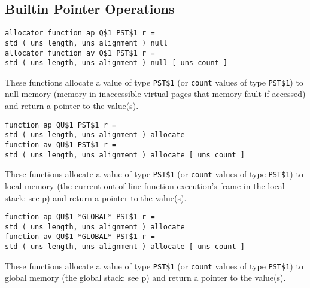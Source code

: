 \documentclass[12pt]{article}
\newcommand{\pagref}[1]{p\pageref{#1}}
\newenvironment{indpar}[1][0.3in]%
	{\begin{list}{}%
		     {\setlength{\itemsep}{0in}%
		      \setlength{\topsep}{0in}%
		      \setlength{\parsep}{1ex}%
		      \setlength{\labelwidth}{#1}%
		      \setlength{\leftmargin}{#1}%
		      \addtolength{\leftmargin}{\labelsep}}%
	 \item}%
	{\end{list}}
\begin{document}
\subsection{Builtin Pointer Operations}
\label{BUILTIN-POINTER-OPERATIONS}

{\tt allocator function ap Q\$1  PST\$1 r = \\
\hspace*{1in}std ( uns length, uns alignment ) null}%
\label{NULL} \\
{\tt allocator function av Q\$1  PST\$1 r = \\
\hspace*{1in}std ( uns length, uns alignment ) null [ uns count ]}
\begin{indpar}
These functions allocate a value of type {\tt PST\$1}
(or {\tt count} values of type {\tt PST\$1}) to null
memory (memory in inaccessible virtual pages that memory fault if
accessed)
and return a pointer to the value(s).
\end{indpar}

{\tt function ap QU\$1  PST\$1 r = \\
\hspace*{1in}std ( uns length, uns alignment ) allocate}%
\label{LOCAL} \\
{\tt function av QU\$1  PST\$1 r = \\
\hspace*{1in}std ( uns length, uns alignment ) allocate [ uns count ]}
\begin{indpar}
These functions allocate a value of type {\tt PST\$1}
(or {\tt count} values of type {\tt PST\$1}) to local
memory (the current out-of-line function execution's frame in the local stack:
see \pagref{OUT-OF-LINE-LOCALS})
and return a pointer to the value(s).
\end{indpar}

{\tt function ap QU\$1 *GLOBAL* PST\$1 r = \\
\hspace*{1in}std ( uns length, uns alignment ) allocate}%
\label{GLOBAL} \\
{\tt function av QU\$1 *GLOBAL* PST\$1 r = \\
\hspace*{1in}std ( uns length, uns alignment ) allocate [ uns count ]}
\begin{indpar}
These functions allocate a value of type {\tt PST\$1}
(or {\tt count} values of type {\tt PST\$1}) to global
memory (the global stack: see \pagref{GLOBAL-MEMORY})
and return a pointer to the value(s).
\end{indpar}
\end{document}
